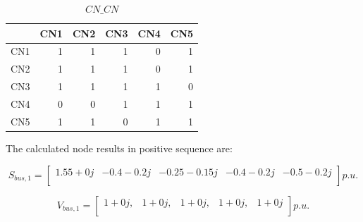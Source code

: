 \documentclass[nols,a4paper,twoside,notoc,fleqn]{tufte-book}
\begin{document}
\begin{table}[h!]
	\begin{tabular}{lrrrrr}
		\toprule
		{} &  CN1 &  CN2 &  CN3 &  CN4 &  CN5 \\
		\midrule
		CN1 &    1 &    1 &    1 &    0 &    1 \\
		CN2 &    1 &    1 &    1 &    0 &    1 \\
		CN3 &    1 &    1 &    1 &    1 &    0 \\
		CN4 &    0 &    0 &    1 &    1 &    1 \\
		CN5 &    1 &    1 &    0 &    1 &    1 \\
		\bottomrule
	\end{tabular}
\caption{$CN\_CN$}
\end{table}





The calculated node results in positive sequence are:
%

$$
S_{bus,1} = \left[ \begin{array}{ccccc}
1.55+0  j & -0.4 -0.2 j & -0.25-0.15j & -0.4 -0.2 j & -0.5 -0.2 j\\
\end{array} \right] p.u.
$$

$$
V_{bus,1} = \left[ \begin{array}{ccccc}
1+0j, & 1+0j,  & 1+0j, & 1+0j,  & 1+0j \\
\end{array} \right] p.u.
$$
\end{document}
